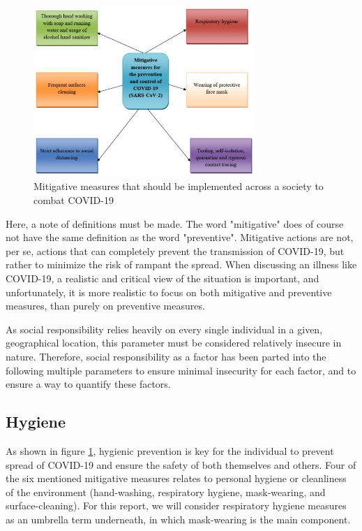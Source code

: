 \begin{figure}[H]
    \centering
    \includegraphics[width=0.75\textwidth]{0_billeder/mitigation of COVID-19.JPG}
    \caption{Mitigative measures that should be implemented across a society to combat COVID-19 \citep{ayenigbara_covid-19_2020}}
    \label{fig:Mitigative-Measures}
\end{figure}

Here, a note of definitions must be made. The word "mitigative" does of course not have the same definition as the word "preventive". Mitigative actions are not, per se, actions that can completely prevent the transmission of COVID-19, but rather to minimize the risk of rampant the spread. When discussing an illness like COVID-19, a realistic and critical view of the situation is important, and unfortunately, it is more realistic to focus on both mitigative and preventive measures, than purely on preventive measures.

As social responsibility relies heavily on every single individual in a given, geographical location, this parameter must be considered relatively insecure in nature. Therefore, social responsibility as a factor has been parted into the following multiple parameters to ensure minimal insecurity for each factor, and to ensure a way to quantify these factors. 

\subsection{Hygiene}
As shown in figure \ref{fig:Mitigative-Measures}, hygienic prevention is key for the individual to prevent spread of COVID-19 and ensure the safety of both themselves and others. Four of the six mentioned mitigative measures relates to personal hygiene or cleanliness of the environment (hand-washing, respiratory hygiene, mask-wearing, and surface-cleaning). For this report, we will consider respiratory hygiene measures as an umbrella term underneath, in which mask-wearing is the main component.

